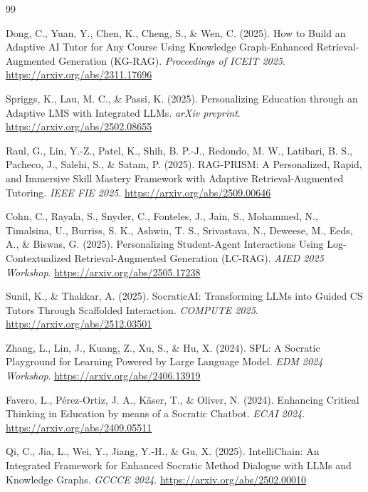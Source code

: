 \documentclass[12pt,a4paper]{report}
\begin{document}
\renewcommand{\bibname}{References}
\begin{thebibliography}{99}
\setlength{\itemsep}{6pt}
\RaggedRight

 Dong, C., Yuan, Y., Chen, K., Cheng, S., \& Wen, C. (2025). How to Build an
Adaptive AI Tutor for Any Course Using Knowledge Graph-Enhanced Retrieval-Augmented
Generation (KG-RAG). \emph{Proceedings of ICEIT 2025}.
\url{https://arxiv.org/abs/2311.17696}

 Spriggs, K., Lau, M. C., \& Passi, K. (2025). Personalizing Education through
an Adaptive LMS with Integrated LLMs. \emph{arXiv preprint}.
\url{https://arxiv.org/abs/2502.08655}

 Raul, G., Lin, Y.-Z., Patel, K., Shih, B. P.-J., Redondo, M. W., Latibari, B.
S., Pacheco, J., Salehi, S., \& Satam, P. (2025). RAG-PRISM: A Personalized, Rapid, and
Immersive Skill Mastery Framework with Adaptive Retrieval-Augmented Tutoring.
\emph{IEEE FIE 2025}. \url{https://arxiv.org/abs/2509.00646}

 Cohn, C., Rayala, S., Snyder, C., Fonteles, J., Jain, S., Mohammed, N.,
Timalsina, U., Burriss, S. K., Ashwin, T. S., Srivastava, N., Deweese, M., Eeds, A., \&
Biswas, G. (2025). Personalizing Student-Agent Interactions Using Log-Contextualized
Retrieval-Augmented Generation (LC-RAG). \emph{AIED 2025 Workshop}.
\url{https://arxiv.org/abs/2505.17238}

 Sunil, K., \& Thakkar, A. (2025). SocraticAI: Transforming LLMs into Guided CS
Tutors Through Scaffolded Interaction. \emph{COMPUTE 2025}.
\url{https://arxiv.org/abs/2512.03501}

 Zhang, L., Lin, J., Kuang, Z., Xu, S., \& Hu, X. (2024). SPL: A Socratic
Playground for Learning Powered by Large Language Model. \emph{EDM 2024 Workshop}.
\url{https://arxiv.org/abs/2406.13919}

 Favero, L., P\'erez-Ortiz, J. A., K\"aser, T., \& Oliver, N. (2024). Enhancing
Critical Thinking in Education by means of a Socratic Chatbot. \emph{ECAI 2024}.
\url{https://arxiv.org/abs/2409.05511}

 Qi, C., Jia, L., Wei, Y., Jiang, Y.-H., \& Gu, X. (2025). IntelliChain: An
Integrated Framework for Enhanced Socratic Method Dialogue with LLMs and Knowledge Graphs.
\emph{GCCCE 2024}. \url{https://arxiv.org/abs/2502.00010}


\end{thebibliography}
\end{document}
